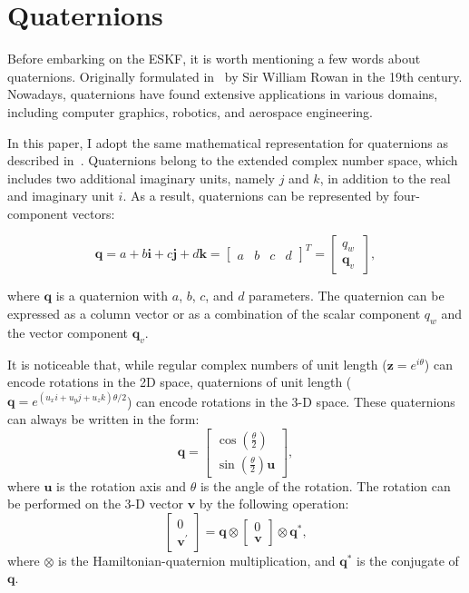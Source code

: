 \section{Quaternions}

Before embarking on the ESKF, it is worth mentioning a few words about quaternions. Originally formulated in~\cite{quaternions} by Sir William Rowan in the 19th century. Nowadays, quaternions have found extensive applications in various domains, including computer graphics, robotics, and aerospace engineering.

In this paper, I adopt the same mathematical representation for quaternions as described in~\cite{quaternion-eskf}. Quaternions belong to the extended complex number space, which includes two additional imaginary units, namely $j$ and $k$, in addition to the real and imaginary unit $i$. As a result, quaternions can be represented by four-component vectors:

\begin{equation}
    \mathbf{q} = a + b\mathbf{i} + c\mathbf{j} + d\mathbf{k} = \begin{bmatrix}
    a & b & c & d
    \end{bmatrix}^T = \begin{bmatrix}
    q_w \ \\ \mathbf{q}_v
    \end{bmatrix},
\end{equation}

where $\mathbf{q}$ is a quaternion with $a$, $b$, $c$, and $d$ parameters. The quaternion can be expressed as a column vector or as a combination of the scalar component $q_w$ and the vector component $\mathbf{q}_{v}$. 

It is noticeable that, while regular complex numbers of unit length ($\mathbf{z}=e^{i\theta}$) can encode rotations in the 2D space, quaternions of unit length ($\mathbf{q}=e^{(u_{x}i+u_{y}j+u_{z}k)\theta/2}$) can encode rotations in the 3-D space. These quaternions can always be written in the form:
\begin{equation}
    \mathbf{q}=\begin{bmatrix}
        \cos\left(\frac{\theta}{2}\right) \\
        \sin\left(\frac{\theta}{2}\right)\mathbf{u}
    \end{bmatrix},
\end{equation}
where $\mathbf{u}$ is the rotation axis and $\theta$ is the angle of the rotation. The rotation can be performed on the 3-D vector $\mathbf{v}$ by the following operation:
\begin{equation}
    \begin{bmatrix}
        0 \\ 
        \mathbf{v}^{'}
    \end{bmatrix}=\mathbf{q}\otimes\begin{bmatrix}
        0 \\ 
        \mathbf{v}
    \end{bmatrix}\otimes\mathbf{q}^*,
    \label{eq:quat-rot}
\end{equation}
where $\otimes$ is the Hamiltonian-quaternion multiplication, and $\mathbf{q}^*$ is the conjugate of $\mathbf{q}$. 

